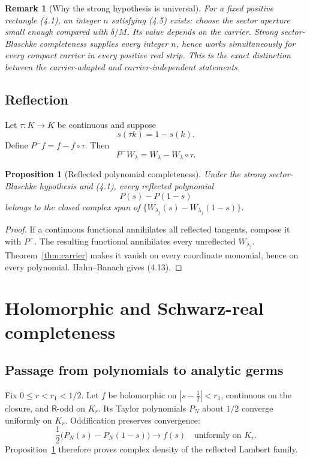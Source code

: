 \documentclass[11pt]{article}
\newtheorem{proposition}[theorem]{Proposition}
\newtheorem{remark}[theorem]{Remark}
\newcommand{\FE}{\mathsf R}
\begin{document}
\begin{remark}[Why the strong hypothesis is universal]
For a fixed positive rectangle (4.1), an integer \(n\) satisfying (4.5) exists:
choose the sector aperture small enough compared with \(\delta/M\).  Its value
depends on the carrier.  Strong sector-Blaschke completeness supplies every
integer \(n\), hence works simultaneously for every compact carrier in every
positive real strip.  This is the exact distinction between the carrier-adapted
and carrier-independent statements.
\end{remark}

\subsection{Reflection}

Let \(\tau:K\to K\) be continuous and suppose
\[
 s(\tau k)=1-s(k).
 \tag{4.11}
\]
Define \(P^-f=f-f\circ\tau\).  Then
\[
 P^-W_\lambda
 =W_\lambda-W_\lambda\circ\tau.
 \tag{4.12}
\]

\begin{proposition}[Reflected polynomial completeness]\label{prop:poly}
Under the strong sector-Blaschke hypothesis and (4.1), every reflected polynomial
\[
 P(s)-P(1-s)
 \tag{4.13}
\]
belongs to the closed complex span of
\(\{W_{\lambda_j}(s)-W_{\lambda_j}(1-s)\}\).
\end{proposition}

\begin{proof}
If a continuous functional annihilates all reflected tangents, compose it with
\(P^-\).  The resulting functional annihilates every unreflected \(W_{\lambda_j}\).
Theorem~\ref{thm:carrier} makes it vanish on every coordinate monomial, hence on
every polynomial.  Hahn--Banach gives (4.13).
\end{proof}

\section{Holomorphic and Schwarz-real completeness}

\subsection{Passage from polynomials to analytic germs}

Fix \(0\leq r<r_1<1/2\).  Let \(f\) be holomorphic on
\(|s-\frac12|<r_1\), continuous on the closure, and \(\FE\)-odd on \(K_r\).
Its Taylor polynomials \(P_N\) about \(1/2\) converge uniformly on \(K_r\).
Oddification preserves convergence:
\[
 \frac12\bigl(P_N(s)-P_N(1-s)\bigr)\longrightarrow f(s)
 \quad\text{uniformly on }K_r.
 \tag{5.1}
\]
Proposition~\ref{prop:poly} therefore proves complex density of the reflected
Lambert family.
\end{document}

